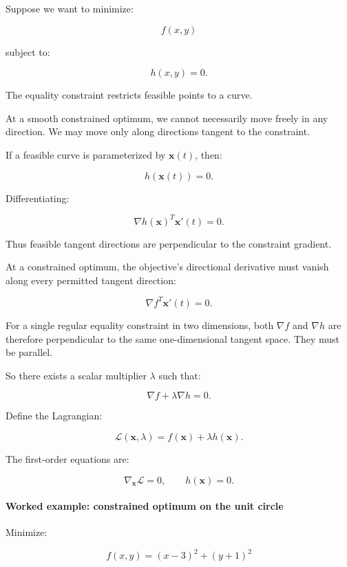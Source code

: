 Suppose we want to minimize:

\[
f(x,y)
\]

subject to:

\[
h(x,y)=0.
\]

The equality constraint restricts feasible points to a curve.

At a smooth constrained optimum, we cannot necessarily move freely in any direction. We may move only along directions tangent to the constraint.

If a feasible curve is parameterized by \(\mathbf x(t)\), then:

\[
h(\mathbf x(t))=0.
\]

Differentiating:

\[
\nabla h(\mathbf x)^T\mathbf x'(t)=0.
\]

Thus feasible tangent directions are perpendicular to the constraint gradient.

At a constrained optimum, the objective's directional derivative must vanish along every permitted tangent direction:

\[
\nabla f^T\mathbf x'(t)=0.
\]

For a single regular equality constraint in two dimensions, both \(\nabla f\) and \(\nabla h\) are therefore perpendicular to the same one-dimensional tangent space. They must be parallel.

So there exists a scalar multiplier \(\lambda\) such that:

\[
\boxed{ \nabla f+\lambda\nabla h=0 }.
\]

Define the Lagrangian:

\[
\boxed{ \mathcal L(\mathbf x,\lambda) = f(\mathbf x)+\lambda h(\mathbf x) }.
\]

The first-order equations are:

\[
\nabla_{\mathbf x}\mathcal L=0, \qquad h(\mathbf x)=0.
\]

\begin{allmightroleexample}

\paragraph{Worked example: constrained optimum on the unit circle}\label{02-foundations-ii-ch026-worked-example-constrained-optimum-on-the-unit-circle}

Minimize:

\end{allmightroleexample}

\[
f(x,y)=(x-3)^2+(y+1)^2
\]

